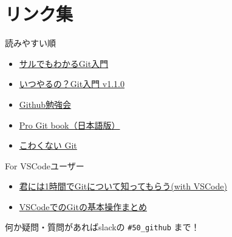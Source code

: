 \documentclass[12pt,dvipdfmx,svgnames,uplatex,aspectratio=169]{beamer}
\begin{document}
\section{リンク集}
\begin{frame}{\insertsection}
  \begin{block}{読みやすい順}
    \begin{itemize}
      \item \href{https://backlog.com/ja/git-tutorial/}{サルでもわかるGit入門}
      \item \href{https://www.slideshare.net/matsukaz/git-28304397}{いつやるの？Git入門 v1.1.0}
      \item \href{https://www.slideshare.net/FromAtom/github-26243260}{Github勉強会}
      \item \href{https://git-scm.com/book/ja/v2}{Pro Git book（日本語版）}
      \item \href{https://www.slideshare.net/kotas/git-15276118}{こわくない Git}
    \end{itemize}
  \end{block}
  \begin{block}{For VSCodeユーザー}
    \begin{itemize}
      \item \href{https://qiita.com/jesus_isao/items/63557eba36819faa4ad9}{君には1時間でGitについて知ってもらう(with VSCode)}
      \item \href{https://qiita.com/y-tsutsu/items/2ba96b16b220fb5913be}{VSCodeでのGitの基本操作まとめ}
    \end{itemize}
  \end{block}
  何か疑問・質問があればslackの \texttt{\#50\_github} まで！
\end{frame}
\end{document}
